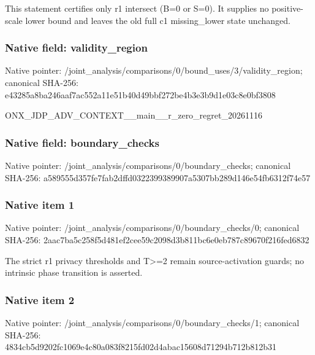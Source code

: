 \documentclass[10pt,a4paper]{article}
\begin{document}
\begingroup\raggedright\sloppy This statement certifies only r1 intersect (B=\allowbreak{}0 or S=\allowbreak{}0). It supplies no positive-scale lower bound and leaves the old full c1 missing\_\allowbreak{}lower state unchanged.\par\endgroup

\subsubsection{Native field: validity\_\allowbreak{}region}
Native pointer: /joint\_\allowbreak{}analysis/comparisons/0/bound\_\allowbreak{}uses/3/validity\_\allowbreak{}region; canonical SHA-256: e43285a8ba246aaf7ac552a11e51b40d49bbf272be4b3e3b9d1e03c8e0bf3808

\begingroup\raggedright\sloppy ONX\_\allowbreak{}JDP\_\allowbreak{}ADV\_\allowbreak{}CONTEXT\_\allowbreak{}\_\allowbreak{}main\_\allowbreak{}\_\allowbreak{}r\_\allowbreak{}zero\_\allowbreak{}regret\_\allowbreak{}20261116\par\endgroup

\subsubsection{Native field: boundary\_\allowbreak{}checks}
Native pointer: /joint\_\allowbreak{}analysis/comparisons/0/boundary\_\allowbreak{}checks; canonical SHA-256: a589555d357fe7fab2dffd0322399389907a5307bb289d146e54fb6312f74e57

\subsubsection{Native item 1}
Native pointer: /joint\_\allowbreak{}analysis/comparisons/0/boundary\_\allowbreak{}checks/0; canonical SHA-256: 2aac7ba5c258f5d481ef2cee59c2098d3b811bc6e0eb787c89670f216fed6832

\begingroup\raggedright\sloppy The strict r1 privacy thresholds and T>=\allowbreak{}2 remain source-activation guards;\allowbreak{} no intrinsic phase transition is asserted.\par\endgroup

\subsubsection{Native item 2}
Native pointer: /joint\_\allowbreak{}analysis/comparisons/0/boundary\_\allowbreak{}checks/1; canonical SHA-256: 4834cb5d9202fc1069e4c80a083f8215fd02d4abac15608d71294b712b812b31
\end{document}
